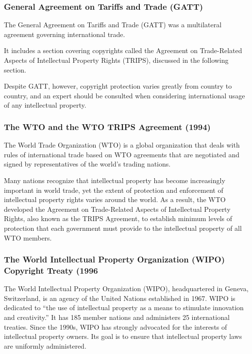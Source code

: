 \documentclass[11pt]{article}
\begin{document}
\subsubsection{General Agreement on Tariffs and Trade (GATT)}
\label{sec:org7e693ac}
The General Agreement on Tariffs and Trade (GATT) was a multilateral agreement
governing international trade.

It includes a section covering copyrights called the Agreement on Trade-Related Aspects of
Intellectual Property Rights (TRIPS), discussed in the following section.

Despite GATT, however, copyright protection varies greatly from country to country, and an expert should be consulted when considering international usage of any intellectual property.
\subsubsection{The WTO and the WTO TRIPS Agreement (1994)}
\label{sec:orgf196bd3}
The World Trade Organization (WTO) is a global organization that deals with rules of international trade based on WTO agreements that are negotiated and signed by representatives of the world’s trading nations.

Many nations recognize that intellectual property has become increasingly important in world trade, yet the extent of protection and enforcement of intellectual property rights varies around the world. As a result, the WTO developed the Agreement on Trade-Related Aspects of Intellectual Property Rights, also known as the TRIPS Agreement, to establish minimum levels of protection that each government must provide to the intellectual property of all WTO members.
\subsubsection{The World Intellectual Property Organization (WIPO) Copyright Treaty (1996}
\label{sec:orgc514d45}
The World Intellectual Property Organization (WIPO), headquartered in Geneva, Switzerland, is an agency of the United Nations established in 1967. WIPO is dedicated to “the use of intellectual property as a means to stimulate innovation and creativity.” It has 185 member nations and administers 25 international treaties. Since the 1990s, WIPO has strongly advocated for the interests of intellectual property owners. Its goal is to ensure that intellectual property laws are uniformly administered.
\end{document}
